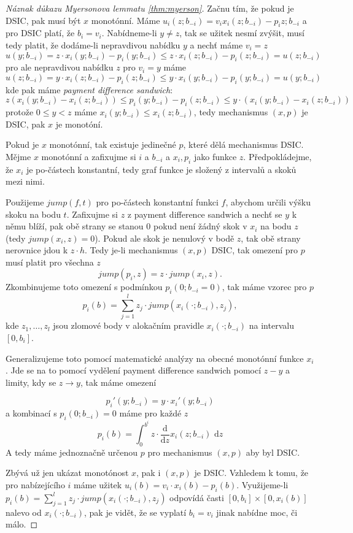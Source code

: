 \begin{proof}[Náznak důkazu Myersonova lemmatu \ref{thm:myerson}]
    Začnu tím, že pokud je DSIC, pak musí být $x$ monotónní. 
    Máme $u_i(z;b_{-i}) = v_i x_i(z;b_{-i}) - p_i{z;b_{-i}}$ a pro DSIC platí, že $b_i = v_i$. 
    Nabídneme-li $y \neq z$, tak se užitek nesmí zvýšit, musí tedy platit, že dodáme-li nepravdivou nabídku $y$ a nechť máme $v_i = z$
    \[
        u(y;b_{-i}) = z\cdot x_i(y;b_{-i}) -p_i(y;b_{-i}) \leq z\cdot x_i(z;b_{-i}) -p_i(z;b_{-i}) = u(z;b_{-i})
    \]
    pro ale nepravdivou nabídku $z$ pro $v_i =y$ máme 
    \[
        u(z;b_{-i}) = y\cdot x_i(z;b_{-i}) -p_i(z;b_{-i}) \leq y\cdot x_i(y;b_{-i}) -p_i(y;b_{-i}) = u(y;b_{-i})
    \]
    kde pak máme \textit{payment difference sandwich}: 
    \[
        z(x_i(y;b_{-i}) -x_i(z;b_{-i})) \leq p_i(y;b_{-i}) - p_i(z;b_{-i}) \leq y\cdot (x_i(y;b_{-i}) - x_i(z;b_{-i}))
    \]
    protože $0\leq y < z$ máme $x_i(y;b_{-i}) \leq x_i(z;b_{-i})$, tedy mechanismus $(x,p)$ je DSIC, pak $x$ je monotóní. 

    Pokud je $x$ monotónní, tak existuje jedinečné $p$, které dělá mechanismus DSIC. 
    Mějme $x$ monotónní a zafixujme si $i$ a $b_{-i}$ a $x_i, p_i$ jako funkce $z$.
    Předpokládejme, že $x_i$ je po-částech konstantní, tedy graf funkce je složený z intervalů a skoků mezi nimi. 
    
    Použijeme $jump(f,t)$ pro po-částech konstantní funkci $f$, abychom určili výšku skoku na bodu $t$. 
    Zafixujme si $z$ z payment difference sandwich a nechť se $y$ k němu blíží, pak obě strany se stanou 0 pokud není žádný skok v $x_i$ na bodu $z$ (tedy $jump(x_i, z) = 0$). 
    Pokud ale skok je nenulový v  bodě $z$, tak obě strany nerovnice jdou k $z\cdot h$. 
    Tedy je-li mechanismus $(x,p)$ DSIC, tak omezení pro $p$ musí platit pro všechna $z$
    \[
        jump(p_i, z) = z\cdot jump(x_i,z). 
    \]
    Zkombinujeme toto omezení s podmínkou $p_i(0;b_{-i} = 0)$, tak máme vzorec pro $p$ 
    \[
        p_i(b) =\sum^l_{j=1} z_j \cdot jump(x_i(\cdot;b_{-i}), z_j), 
    \]
    kde $z_1,\dots,z_l$ jsou zlomové body v alokačním pravidle $x_i(\cdot; b_{-i})$ na intervalu $[0,b_i]$. 

    Generalizujeme toto pomocí matematické analýzy na obecné monotónní funkce $x_i$. 
    Jde se na to pomocí vydělení payment difference sandwich pomocí $z-y$ a limity, kdy se $z \rightarrow y$, tak máme omezení 

    \[
        p_i'(y;b_{-i}) = y \cdot x_i'(y;b_{-i})
    \]
    a kombinací s $p_i(0; b_{-i}) =0$ máme pro každé $z$ 
    \[
        p_i(b) = \int^{b^i}_0 z \cdot \frac{\text{d}}{\text{d}z} x_i(z;b_{-i}) \text{ d}z 
    \]
    A tedy máme jednoznačně určenou $p$ pro mechanismus $(x,p)$ aby byl DSIC. 

    Zbývá už jen ukázat monotónost $x$, pak i $(x,p)$ je DSIC. 
    Vzhledem k tomu, že pro nabízejícího $i$ máme užitek $u_i(b) = v_i \cdot x_i(b) - p_i(b)$. 
    Využijeme-li $p_i(b) =\sum^l_{j=1} z_j \cdot jump(x_i(\cdot;b_{-i}), z_j)$ odpovídá časti $[0,b_i] \times [0,x_i(b)]$ nalevo od $x_i(\cdot; b_{-i})$, pak je vidět, že se vyplatí $b_i = v_i$ jinak nabídne moc, či málo.
\end{proof}
